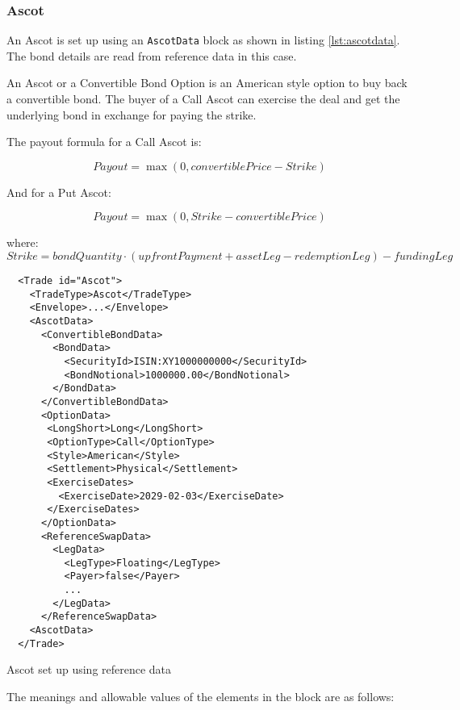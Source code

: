 \subsubsection{Ascot}
\label{ss:ascot}

An Ascot is set up using an {\tt AscotData} block as shown in listing
\ref{lst:ascotdata}. The bond details are read from reference data in this case.

An Ascot or a Convertible Bond Option is an American style  option to buy back a convertible bond. The buyer of a Call Ascot can exercise the deal and get the underlying bond in
exchange for paying the strike.

The payout formula for a Call Ascot is:

$$
Payout = \max(0, convertiblePrice - Strike)
$$

And for a Put Ascot:

$$
Payout = \max(0, Strike - convertiblePrice)
$$

where: 
$$
Strike = bondQuantity \cdot (upfrontPayment + assetLeg - redemptionLeg) - fundingLeg
$$


\begin{listing}[H]
\begin{verbatim}
  <Trade id="Ascot">
    <TradeType>Ascot</TradeType>
    <Envelope>...</Envelope>
    <AscotData>
      <ConvertibleBondData>
        <BondData>
          <SecurityId>ISIN:XY1000000000</SecurityId>
          <BondNotional>1000000.00</BondNotional>
        </BondData>
      </ConvertibleBondData>
      <OptionData>
       <LongShort>Long</LongShort>
       <OptionType>Call</OptionType>
       <Style>American</Style>
       <Settlement>Physical</Settlement>
       <ExerciseDates>
         <ExerciseDate>2029-02-03</ExerciseDate>
       </ExerciseDates>  
      </OptionData>
      <ReferenceSwapData>
        <LegData>
          <LegType>Floating</LegType>
          <Payer>false</Payer>
          ...
        </LegData>
      </ReferenceSwapData>
    <AscotData>
  </Trade>
\end{verbatim}
\caption{Ascot set up using reference data}
\label{lst:ascotdata}
\end{listing}

The meanings and allowable values of the elements in the block are as follows:

